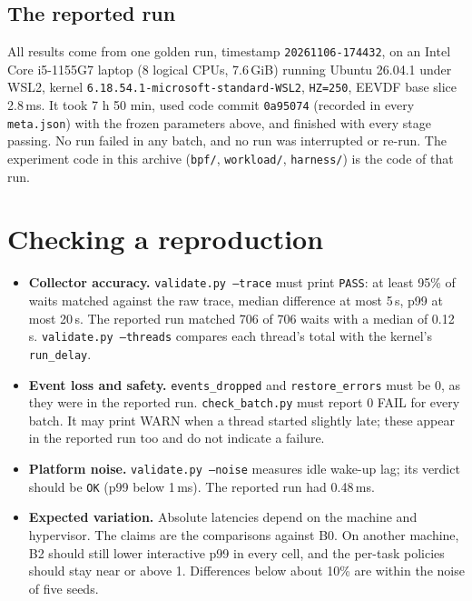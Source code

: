 \documentclass[10.5pt,a4paper]{article}
\newcommand{\f}[1]{\texttt{#1}}
\begin{document}
\subsection{The reported run}
All results come from one golden run, timestamp \f{20261106-174432}, on an Intel Core i5-1155G7 laptop (8 logical CPUs, 7.6\,GiB) running Ubuntu 26.04.1 under WSL2, kernel \f{6.18.54.1-microsoft-standard-WSL2}, \f{HZ=250}, EEVDF base slice 2.8\,ms. It took 7 h 50 min, used code commit \f{0a95074} (recorded in every \f{meta.json}) with the frozen parameters above, and finished with every stage passing. No run failed in any batch, and no run was interrupted or re-run. The experiment code in this archive (\f{bpf/}, \f{workload/}, \f{harness/}) is the code of that run.

\section{Checking a reproduction}
\begin{itemize}
\item \textbf{Collector accuracy.} \f{validate.py --trace} must print \f{PASS}: at least 95\% of waits matched against the raw trace, median difference at most 5\,\textmu s, p99 at most 20\,\textmu s. The reported run matched 706 of 706 waits with a median of 0.12\,\textmu s. \f{validate.py --threads} compares each thread's total with the kernel's \f{run\_delay}.
\item \textbf{Event loss and safety.} \f{events\_dropped} and \f{restore\_errors} must be 0, as they were in the reported run. \f{check\_batch.py} must report 0 FAIL for every batch. It may print WARN when a thread started slightly late; these appear in the reported run too and do not indicate a failure.
\item \textbf{Platform noise.} \f{validate.py --noise} measures idle wake-up lag; its verdict should be \f{OK} (p99 below 1\,ms). The reported run had 0.48\,ms.
\item \textbf{Expected variation.} Absolute latencies depend on the machine and hypervisor. The claims are the comparisons against B0. On another machine, B2 should still lower interactive p99 in every cell, and the per-task policies should stay near or above 1. Differences below about 10\% are within the noise of five seeds.
\end{itemize}
\end{document}
